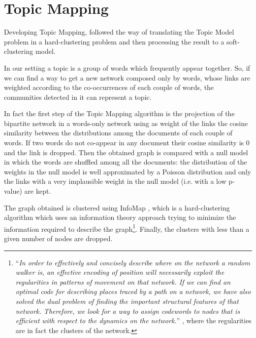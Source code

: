 \documentclass[11pt, a4paper, oneside, openright]{book}
\begin{document}
\section{Topic Mapping}
\label{sec:tm}
Developing Topic Mapping, \textcite{lancichinetti2015} followed the way of translating the Topic Model problem in a hard-clustering problem and then processing the result to a soft-clustering model.

In our setting a topic is a group of words which frequently appear together. So, if we can find a way to get a new network composed only by words, whose links are weighted according to the co-occurrences of each couple of words, the communities detected in it can represent a topic.

In fact the first step of the Topic Mapping algorithm is the projection of the bipartite network in a words-only network using as weight of the links the cosine similarity between the distributions among the documents of each couple of words. If two words do not co-appear in any document their cosine similarity is 0 and the link is dropped. Then the obtained graph is compared with a null model in which the words are shuffled among all the documents: the distribution of the weights in the null model is well approximated by a Poisson distribution and only the links with a very implausible weight in the null model (i.e. with a low p-value) are kept.

The graph obtained is clustered using InfoMap \parencite{rosvall2008,rosvall2009}, which is a hard-clustering algorithm which uses an information theory approach trying to minimize the information required to describe the graph\footnote{``\textit{In order to effectively and concisely describe where on the network a random walker is, an
effective encoding of position will necessarily exploit the regularities in patterns of movement
on that network. If we can find an optimal code for describing places traced by a path on a
		network, we have also solved the dual problem of finding the important structural features of
that network. Therefore, we look for a way to assign codewords to nodes that is efficient with
respect to the dynamics on the network.}'' \parencite{rosvall2009}, where the regularities are in fact the clusters of the network.}. Finally, the clusters with less than a given number of nodes are dropped.
\end{document}
